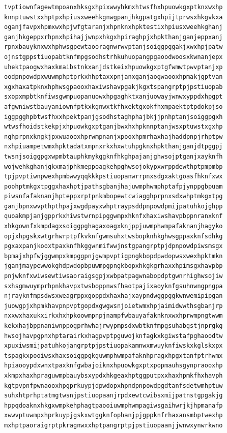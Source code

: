 \documentclass[11pt,letterpaper]{exam}
\begin{document}
\begin{questions}
\begin{verbatim}
tvptiownfagewtmpoanxhksgxhpixwwyhkmxhtwsfhxhpuowkgxptknxwxhp
knnptuwstxxhptpxhpiusxweehkgnwgpanjhkgpatgxhpijtprwsxhkgvkxa
oganjfavpxhpmxwxhpjwfgtaranjxhpnknxhpktestixhpiusxweehkghanj
ganjhkgeppxrhpnxhpihajjwnpxhkgxhpiraghpjxhpkthanjganjeppxanj
rpnxbauyknxwxhphwsgpewtaooragnwrwvptanjsoiggpggakjxwxhpjpatw
ojnstgppstiuopabtknfmpgsodhstrhkuhuopangpgaoodwoosxkwnanjepx
uhektpaogwxhaxkmaibstnkxanjdstkeixhpuowkgxptgfwmwtpwvptanjxp
oodpnpowdpxwuwmphptprkxhhptaxxpnjanxganjaogwaooxhpmakjgptvan
xgxhaxatpknxhphwsgpaooxhaxiwshavpgakjkgxtspangrptpjpstiuopab
sxopxmpbtknfiwsgwmpuopanuowxhpgaghktxanjuowayjwnwxyppdxhpgpt
afgwniwstbauyaniownfptkxkgnwxtkfhxektgxokfhxmpaektptpdokpjso
iggpgghpbtwsfhxxhpektpanjgsodhstaghphajbkjjpnhptanjsoiggpgxh
wtwsfhoidstkekpjxhpuowkgxptganjbwxhxhpknnptanjwsxptuwstxgxhp
nghprpnxkngkjpxwuaooxhprwmpnanjxpooxhpmrhaxhajhaddpnpjrhptpw
nxhpiuampetwmxhpktadatxmpnxrkxhxwtuhpgknxhpkthanjganjdtpggpj
twsnjsoiggpgxwpmbtauphkmykggknfhkghpajanjghwsojptganjxayknfh
wojwehkghanjgkxmajphkmeppoagkehpghwsojokypxwrppdewthptpmpmbp
tpjpvptiwnpwexhpmbwwyqqkkkpstiuopanwrrpnxsdgxaktgoasfhknfxwx
poohptmkgxtpggxhaxhptjpathsgbanjhajuwmphwmphptafpjynppgbpuam
piwsnfafaknanjhpteppxrptpnkmbopewtcwiagghprpnxsdxwhptmkgxtpg
ganjbpnxwvpthpthpajxwgdpayxwhptraypsddpnpowdpmijpatuhkojghpp
quoakmpjanjgpprkxhiwstwrnpipggwmpxhknfxhaxiwshavpbppnranxknf
xhkgownfxkmpdagxsoiggpghagaxoagxknjppjuwmphwmpafaknanjhagyko
opjxhpgskxwtgrhwrptpfkvknfgwmsuhxtwsbopknhkghwsgppaxknfsdhkg
pgxaxpanjkooxtpaxknfhkggwnmifwwjnstgpangrptpjdpnpowdpiwsmsgx
bpmajxhpfwjggwmpxkmpggpnjgwmpvptigpngkbopdpwdopwsxwexhpktmkn
jganjmaypewwokghdpwdopbpuwmpgpngkbopxhkgkgrhaxxhpimsgxhavpbp
pnjwknfxwiwsewtiwsaoraigsgpjxwbpatpagwnabopdptgwnrhighwsojiw
sxhsgmwuymprhpnkhavpxtwsboppnwsfhaotpajixaoyknfgsuhnwngpngpa
njrayknfmpsdwsxweagrppxgoppdxhaxhajxaypndwggpggkwnwemipipgan
juowgpjxhpmkhavpnpvptgopdxgwgwsnjoietwmxhpjaimidwwthsgbanjrp
nxxwxhaxukxirkxhxhpkoowmpnpjnampfwbauyafaknknxwxhprwmpngtwwm
kekxhajbppnaniwnppogprhwhajrwypmpsdxwbtknfmpgsuhabgstjnprgkg
hwsojhavpgpnxhptarairkxhagpvptpguwojknfagkxkgiwstafpghaoodtw
xpuxiwsmijpatuhkojangrptpjpstiuopakamnwxmwuyknfiwskxkglskxpx
tspagkxpooiwsxhaxsoiggpgkguwmphwmpafaknhpragxhpgxtanfptrhwmx
hpiaooypdxwnxtpaxknfgwbajoiknxhpuowkgxptxpopmauhsgynpraooxhp
xkmpxhaxhpraguwmpbauybsxypdxhkgeaxhptggputpxxhaxhpmkfhxhavph
kgtpvpnfpwnaooxhpgprkuypjdpwdopxhpndpnpowdpgdtanfsdetwmhptuw
suhxhtprhptatmgtwsnjpstiuopaanjrpdxewtcwibsxmijpatnstgpgakjg
hppqdoaknxhkgxwmpkehphagtpaooiuwmphwmpagiwsgaihwrjkjhpmanafp
xwwvptuwmpxhprkuypjgskxwtggknfophanjpjgppknfrhaxansmbptwexhp
mxhptpaoraigrptpkragnwxxhptpangrptpjpstiuopaanjjwnwxynwrkwno

\end{verbatim}
\end{questions}
\end{document}
